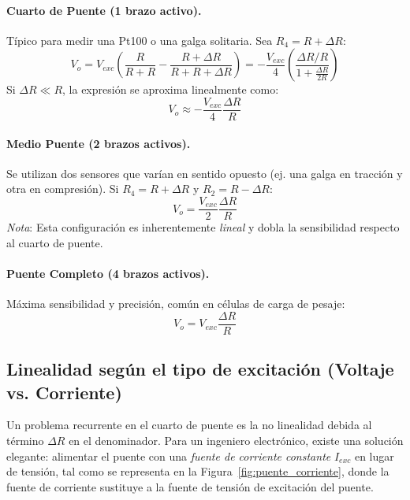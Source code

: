 \paragraph{Cuarto de Puente (1 brazo activo).}
Típico para medir una Pt100 o una galga solitaria. Sea $R_4 = R + \Delta R$:
\begin{equation}
    V_o = V_{exc} \left( \frac{R}{R+R} - \frac{R+\Delta R}{R + R + \Delta R} \right) = - \frac{V_{exc}}{4} \left( \frac{\Delta R/R}{1 + \frac{\Delta R}{2R}} \right)
\end{equation}
Si $\Delta R \ll R$, la expresión se aproxima linealmente como:
\begin{equation}
    V_o \approx - \frac{V_{exc}}{4} \frac{\Delta R}{R}
\end{equation}

\paragraph{Medio Puente (2 brazos activos).}
Se utilizan dos sensores que varían en sentido opuesto (ej. una galga en tracción y otra en compresión). Si $R_4 = R + \Delta R$ y $R_2 = R - \Delta R$:
\begin{equation}
    V_o = \frac{V_{exc}}{2} \frac{\Delta R}{R}
\end{equation}
\emph{Nota}: Esta configuración es inherentemente \emph{lineal} y dobla la sensibilidad respecto al cuarto de puente.

\paragraph{Puente Completo (4 brazos activos).}
Máxima sensibilidad y precisión, común en células de carga de pesaje:
\begin{equation}
    V_o = V_{exc} \frac{\Delta R}{R}
\end{equation}

\subsection{Linealidad según el tipo de excitación (Voltaje vs. Corriente)}

Un problema recurrente en el cuarto de puente es la no linealidad debida al término $\Delta R$ en el denominador. Para un ingeniero electrónico, existe una solución elegante: alimentar el puente con una \emph{fuente de corriente constante} $I_{exc}$ en lugar de tensión, tal como se representa en la Figura~\ref{fig:puente_corriente}, donde la fuente de corriente sustituye a la fuente de tensión de excitación del puente.

